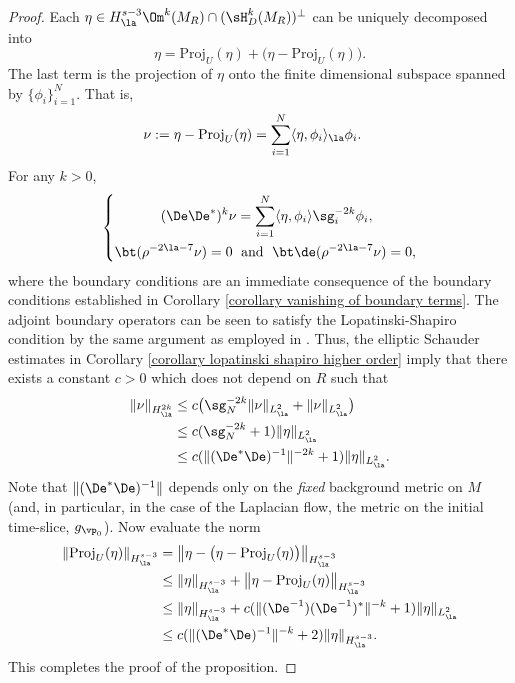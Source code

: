 \documentclass[hidelinks, 12pt, oneside, reqno]{amsart}
\begin{document}
\begin{proof}
    Each $\eta \in H^{s-3}_{\la}\Om^k(M_R) \cap (\sH^k_D(M_R))^\perp$ can be uniquely decomposed into
    \[
    \eta = \mathrm{Proj}_{U}(\eta) + \big(\eta -\mathrm{Proj}_{U}(\eta) \big).
    \]
    The last term is the projection of $\eta$ onto the finite dimensional subspace spanned by $\{\phi_i\}_{i= 1}^N$. That is,
    \begin{align*}
        \nu := \eta -\mathrm{Proj}_{U}(\eta)  &= \sum_{i=1}^N \langle \eta, \phi_i \rangle_{\la} \phi_i.
    \end{align*}
    For any $k > 0$,
    \begin{equation*}
        \left\{
            \begin{aligned}
                (\De \De^*)^k \nu &= \sum_{i=1}^N \langle \eta, \phi_i \rangle \sg_i^{-2k} \phi_i,\\
                \bt (\rho^{-2\la - 7} \nu) = 0 \;&\textrm{ and }\; \bt \de (\rho^{-2\la - 7} \nu) = 0,
            \end{aligned}
        \right.
    \end{equation*}
    where the boundary conditions are an immediate consequence of the boundary conditions established in Corollary \ref{corollary vanishing of boundary terms}. The adjoint boundary operators can be seen to satisfy the Lopatinski-Shapiro condition by the same argument as employed in \cite[Lemma 1.6.5]{HodgeDecompSchwarz}. Thus, the elliptic Schauder estimates in Corollary \ref{corollary lopatinski shapiro higher order} imply that there exists a constant $c > 0$ which does not depend on $R$ such that
    \begin{align*}
    \|\nu\|_{H^{2k}_{\la}} &\le c\big(\sg_{N}^{-2k}\|\nu\|_{L^2_{\la}} + \|\nu\|_{L^2_{\la}}\big)  \\
    &\le c(\sg_N^{-2k} + 1)\|\eta\|_{L^2_\la} \\
    &\le c(\|(\De^*\De)^{-1}\|^{-2k} + 1 ) \|\eta\|_{L^{2}_{\la}}.
    \end{align*}
    Note that $\|(\De^*\De)^{-1}\|$ depends only on the \textit{fixed} background metric on $M$ (and, in particular, in the case of the Laplacian flow, the metric on the initial time-slice, $g_{\vp_0}$). Now evaluate the norm 
    \begin{align*}
         \|\mathrm{Proj}_{U}(\eta)\|_{H^{s-3}_{\la}} &= \big\|\eta - \big(\eta -\mathrm{Proj}_{U}(\eta) \big)\big\|_{H^{s-3}_{\la}}\\
         &\le \|\eta\|_{H^{s-3}_{\la}} + \big\|\eta -\mathrm{Proj}_{U}(\eta)\big\|_{H^{s-3}_{\la}} \\
         &\le \|\eta\|_{H^{s-3}_{\la}}  + c(\|(\De^{-1})(\De^{-1})^*\|^{-k} + 1 ) \|\eta\|_{L^{2}_{\la}}\\
         &\le c(\|(\De^*\De)^{-1}\|^{-k} + 2) \|\eta\|_{H^{s-3}_{\la}}.
    \end{align*}
    This completes the proof of the proposition.
\end{proof}
\end{document}

